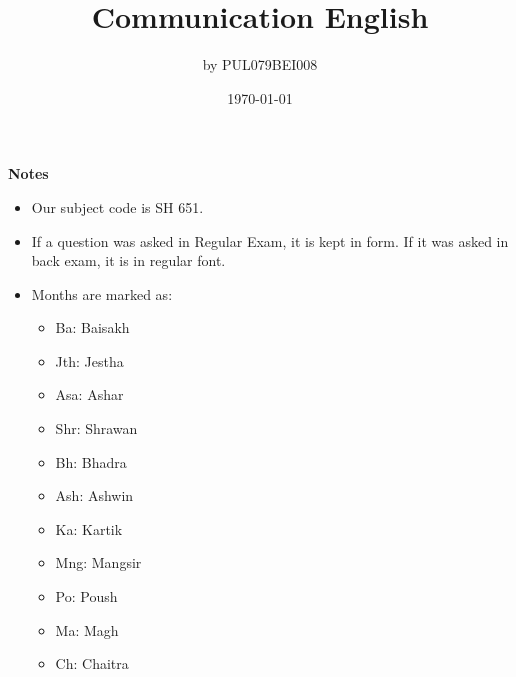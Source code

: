 \documentclass[12pt]{article}
\title{Communication English}
\author{by PUL079BEI008}
\date{\today}
\begin{document}
\maketitle
\vspace{10.5cm}
\textbf{Notes}
\begin{itemize}[noitemsep]
	\item Our subject code is SH 651.
	\item If a question was asked in Regular Exam, it is kept in  form. If it was asked in back exam, it is in regular font.
	\item Months are marked as: 
	\begin{itemize}[noitemsep, topsep=0pt]
		\item Ba: Baisakh
		\item Jth: Jestha
		\item Asa: Ashar
		\item Shr: Shrawan
		\item Bh: Bhadra
		\item Ash: Ashwin
		\item Ka: Kartik
		\item Mng: Mangsir
		\item Po: Poush
		\item Ma: Magh
		\item Ch: Chaitra
	\end{itemize}
\end{itemize}
\pagebreak
\tableofcontents
\pagebreak
\end{document}
